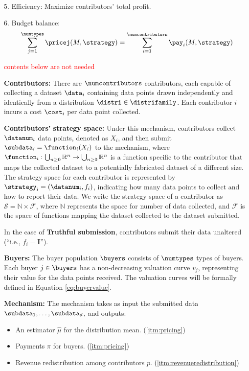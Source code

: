 5. Efficiency: Maximize contributors' total profit. 

6. Budget balance: \[  \sum_{j=1}^{\numtypes} \pricej(M,\strategy) = \sum_{i=1}^{\numcontributors} \pay_i(M,\strategy) \] 




\textcolor{red}{contents below are not needed}

\textbf{Contributors: }There are $\numcontributors$ contributors, each capable of collecting a dataset $\data_i$ containing data points drawn independently and identically from a distribution $\distri \in \distrifamily$. Each contributor $i$ incurs a cost $\cost_i$ per data point collected.


\textbf{Contributors’ strategy space: } Under this mechanism, contributors collect $\datanum_i$ data points, denoted as $X_i$, and then submit $\subdata_i = \function_i(X_i)$ to the mechanism, where $\function_i : \bigcup_{n\geq 0}^{}\mathbb{R}^n \to \bigcup_{n\geq 0}^{}\mathbb{R}^n$ is a function specific to the contributor that maps the collected dataset to a potentially fabricated dataset of a different size. The strategy space for each contributor is represented by $\strategy_i = (\datanum_i, f_i)$, indicating how many data points to collect and how to report their data. 
We write the strategy
space of a contributor as $\mathcal{S}= \mathbb{N} \times \mathcal{F}$, where $ \mathbb{N}$ represents the space for number of data collected, and $\mathcal{F}$ is the space of functions mapping the dataset collected to the
dataset submitted. 

In the case of \textbf{Truthful submission}, contributors submit their data unaltered (“i.e., $f_i = \mathbf{I}$”).






\textbf{Buyers: } The buyer population $\buyers$ consists of $\numtypes$ types of buyers. Each buyer $j \in \buyers$ has a non-decreasing valuation curve $v_j$, representing their value for the data points received. The valuation curves will be formally defined in Equation \ref{eq:buyervalue}.

\textbf{Mechanism: } The mechanism takes as input the submitted data \( \subdata_1, \dots, \subdata_d \), and outputs:

\begin{itemize}
    \item An estimator $\hat{\mu}$ for the distribution mean. (\ref{itm:pricing})
    \item Payments $\pi$ for buyers. (\ref{itm:pricing})
    \item Revenue redistribution among contributors $p$. (\ref{itm:revenueredistribution})
\end{itemize}

